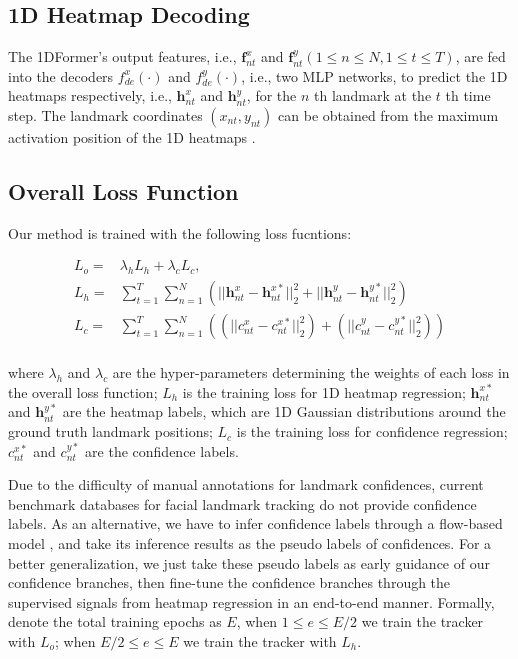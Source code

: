 \documentclass[review]{elsarticle}
\begin{document}
\subsection{1D Heatmap Decoding}
The 1DFormer's output features, i.e., $\textbf{f}^{x}_{nt}$ and $\textbf{f}^{y}_{nt}(1\leq n \leq N, 1\leq t \leq T)$, are fed into the decoders $f^x_{de}(\cdot)$ and $f^y_{de}(\cdot)$,  i.e., two MLP networks, to predict the 1D heatmaps respectively, i.e., $\textbf{h}^{x}_{nt}$ and $\textbf{h}^{y}_{nt}$, for the $n$ th landmark at the $t$ th time step. The landmark coordinates $(x_{nt}, y_{nt})$ can be obtained from the maximum activation position of the 1D heatmaps \cite{AOHR,I2L}.

\subsection{Overall Loss Function}
\label{sec_alg}
Our method is trained with the following loss fucntions:
\begin{small}
	\begin{equation}
		\label{all}
		\begin{split}
			L_o =&  \lambda_h L_h +\lambda_c L_c,  \\
			L_h=&\sum_{t=1}^T\sum_{n=1}^N(||\textbf{h}^x_{nt}-\textbf{h}^{x*}_{nt}||_2^2+||\textbf{h}^y_{nt}-\textbf{h}^{y*}_{nt}||_2^2)\\ 
			L_c =& \sum_{t=1}^T\sum_{n=1}^N((||c^x_{nt} - c^{x*}_{nt}||_2^2)+(||c^y_{nt} - c^{y*}_{nt}||_2^2)) \\
		\end{split}
	\end{equation}
\end{small}
where $\lambda_h$ and $\lambda_c$ are the hyper-parameters determining the weights of each loss in the overall loss function; $L_h$ is the training loss for 1D heatmap regression; $\textbf{h}^{x*}_{nt}$ and $\textbf{h}^{y*}_{nt}$ are the heatmap labels, which are 1D Gaussian distributions around the ground truth landmark positions; $L_c$ is the training loss for confidence regression; $c^{x*}_{nt}$ and $c^{y*}_{nt}$ are the confidence labels. 

Due to the difficulty of manual annotations for landmark confidences, current benchmark databases for facial landmark tracking do not provide confidence labels.  As an alternative, we have to infer confidence labels through a flow-based model \cite{RLE}, and take its inference results as the pseudo labels of confidences. For a better generalization, we just take these pseudo labels as early guidance of our confidence branches, then fine-tune the confidence branches through the supervised signals from heatmap regression in an end-to-end manner. Formally, denote the total training epochs as $E$, when $1\leq e \leq E/2$ we train the tracker with $L_o$; when $E/2 \le e \leq E$ we train the tracker with $L_h$.
\end{document}
